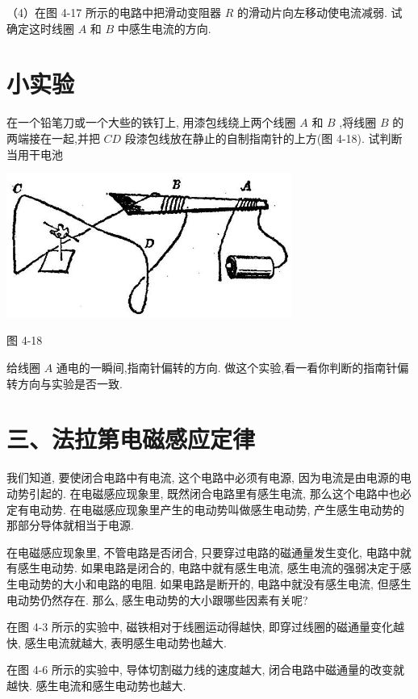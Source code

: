 \documentclass[10pt]{article}
\begin{document}
（4）在图 4-17 所示的电路中把滑动变阻器 \(R\) 的滑动片向左移动使电流减弱. 试确定这时线圈 \(A\) 和 \(B\) 中感生电流的方向.

\section*{小实验}

在一个铅笔刀或一个大些的铁钉上, 用漆包线绕上两个线圈 \(A\) 和 \(B\) ,将线圈 \(B\) 的两端接在一起,并把 \({CD}\) 段漆包线放在静止的自制指南针的上方(图 4-18). 试判断当用干电池

\begin{center}
\includegraphics[max width=0.7\textwidth]{images/01913056-1f15-74d8-9184-9aab52c9d66b_142_831948.jpg}
\end{center}

图 4-18

给线圈 \(A\) 通电的一瞬间,指南针偏转的方向. 做这个实验,看一看你判断的指南针偏转方向与实验是否一致.

\section*{三、法拉第电磁感应定律}

我们知道, 要使闭合电路中有电流, 这个电路中必须有电源, 因为电流是由电源的电动势引起的. 在电磁感应现象里, 既然闭合电路里有感生电流, 那么这个电路中也必定有电动势. 在电磁感应现象里产生的电动势叫做感生电动势, 产生感生电动势的那部分导体就相当于电源.

在电磁感应现象里, 不管电路是否闭合, 只要穿过电路的磁通量发生变化, 电路中就有感生电动势. 如果电路是闭合的, 电路中就有感生电流, 感生电流的强弱决定于感生电动势的大小和电路的电阻. 如果电路是断开的, 电路中就没有感生电流, 但感生电动势仍然存在. 那么, 感生电动势的大小跟哪些因素有关呢?

在图 4-3 所示的实验中, 磁铁相对于线圈运动得越快, 即穿过线圈的磁通量变化越快, 感生电流就越大, 表明感生电动势也越大.

在图 4-6 所示的实验中, 导体切割磁力线的速度越大, 闭合电路中磁通量的改变就越快. 感生电流和感生电动势也越大.
\end{document}
